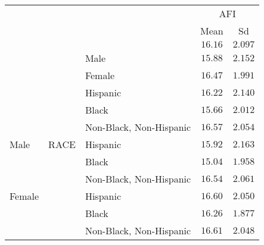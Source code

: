 \begin{tabular}{lllcc}
\hline
& & & \multicolumn{2}{c}{AFI} \\ 
 &  &  & Mean & \multicolumn{1}{c}{Sd} \\ 
\hline
 &  &   & $16.16$ & $2.097$ \\
 &  & \nopagebreak Male  & $15.88$ & $2.152$ \\
 &  & \nopagebreak Female  & $16.47$ & $1.991$ \\
 &  & \nopagebreak Hispanic  & $16.22$ & $2.140$ \\
 &  & \nopagebreak Black  & $15.66$ & $2.012$ \\
 &  & \nopagebreak Non-Black, Non-Hispanic  & $16.57$ & $2.054$ \\
\nopagebreak Male & RACE & \nopagebreak Hispanic  & $15.92$ & $2.163$ \\
 &  & \nopagebreak Black  & $15.04$ & $1.958$ \\
 &  & \nopagebreak Non-Black, Non-Hispanic  & $16.54$ & $2.061$ \\
\nopagebreak Female &  & \nopagebreak Hispanic  & $16.60$ & $2.050$ \\
 &  & \nopagebreak Black  & $16.26$ & $1.877$ \\
 &  & \nopagebreak Non-Black, Non-Hispanic  & $16.61$ & $2.048$ \\
\hline 
\end{tabular}
